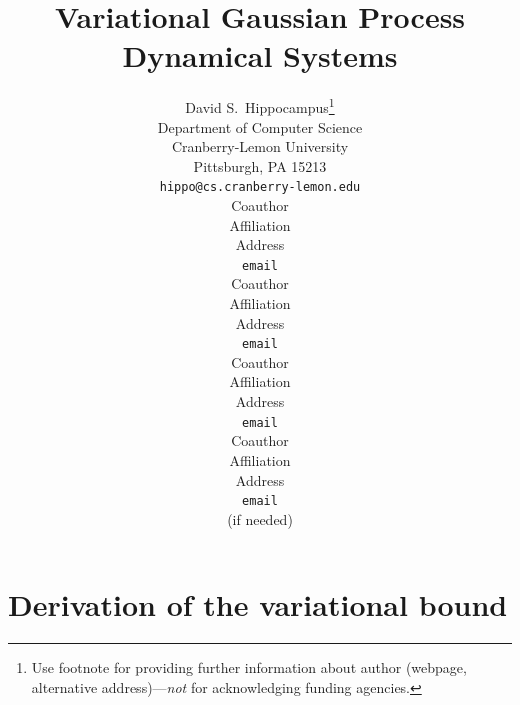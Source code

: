 \documentclass{article} %
\title{Variational Gaussian Process Dynamical Systems}
\author{
David S.~Hippocampus\thanks{ Use footnote for providing further information
about author (webpage, alternative address)---\emph{not} for acknowledging
funding agencies.} \\
Department of Computer Science\\
Cranberry-Lemon University\\
Pittsburgh, PA 15213 \\
\texttt{hippo@cs.cranberry-lemon.edu} \\
\And
Coauthor \\
Affiliation \\
Address \\
\texttt{email} \\
\AND
Coauthor \\
Affiliation \\
Address \\
\texttt{email} \\
\And
Coauthor \\
Affiliation \\
Address \\
\texttt{email} \\
\And
Coauthor \\
Affiliation \\
Address \\
\texttt{email} \\
(if needed)\\
}
\begin{document}
\newcommand{\highlight}[1]{\colorbox{yellow}{#1}}

\newcommand{\bff}{\mathbf{f}}
\newcommand{\bfu}{\mathbf{u}}
\newcommand{\bfy}{\mathbf{y}}
\newcommand{\bfx}{\mathbf{x}}
\newcommand{\bft}{\mathbf{t}}
\newcommand{\bfk}{\mathbf{k}}
\newcommand{\bfmu}{\boldsymbol \mu}
\newcommand{\bfz}{\mathbf{0}}

\newcommand{\T}{{\top}}

\newcommand{\bfa}{\mathbf{a}}
\newcommand{\bb}{\beta^{-1}}
\newcommand{\la}{\left\langle}
\newcommand{\ra}{\right\rangle}
\newcommand{\vv}{\vartheta}

\newcommand{\intd}{\text{d}} %


\section{Derivation of the variational bound}
\end{document}
